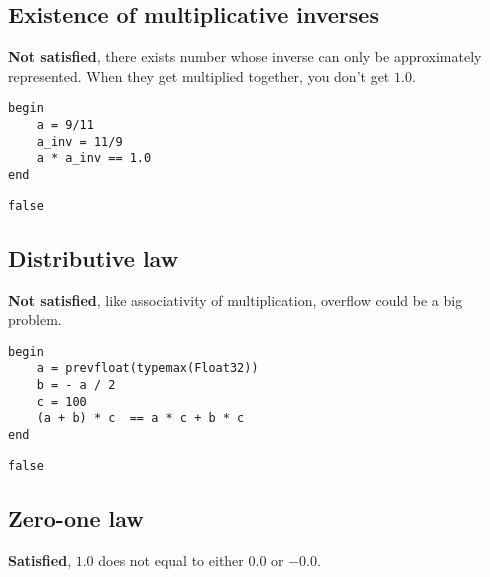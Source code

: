 \documentclass[11pt]{article}
\begin{document}
\subsection{Existence of multiplicative inverses}
\label{sec:orgc5d0d94}
\textbf{Not satisfied}, there exists number whose inverse can only be approximately
represented. When they get multiplied together, you don't get \(1.0\).

\begin{verbatim}
begin
    a = 9/11
    a_inv = 11/9
    a * a_inv == 1.0
end
\end{verbatim}

\begin{verbatim}
false
\end{verbatim}

\subsection{Distributive law}
\label{sec:org6c59f7c}
\textbf{Not satisfied}, like associativity of multiplication, overflow could be a big
problem.

\begin{verbatim}
begin
    a = prevfloat(typemax(Float32))
    b = - a / 2
    c = 100
    (a + b) * c  == a * c + b * c
end
\end{verbatim}

\begin{verbatim}
false
\end{verbatim}

\subsection{Zero-one law}
\label{sec:orge079e87}
\textbf{Satisfied}, \(1.0\) does not equal to either \(0.0\) or \(-0.0\).
\end{document}
